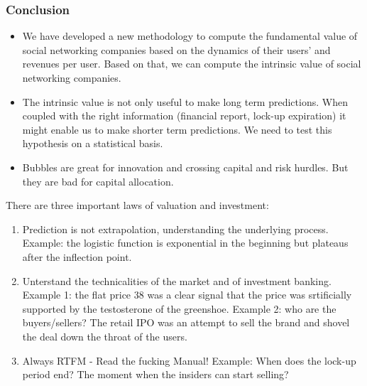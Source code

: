 \subsubsection{Conclusion}

\begin{itemize}
    \item We have developed a new methodology to compute the fundamental
        value of social networking companies based on the dynamics of their
        users' and revenues per user. Based on that, we can compute the
        intrinsic value of social networking companies.
    \item The intrinsic value is not only useful to make long term predictions.
        When coupled with the right information (financial report, lock-up
        expiration) it might enable us to make shorter term predictions. We
        need to test this hypothesis on a statistical basis.
    \item Bubbles are great for innovation and crossing capital and risk
        hurdles. But they are bad for capital allocation.
\end{itemize}

There are three important laws of valuation and investment:
\begin{enumerate}
    \item Prediction is not extrapolation, understanding the underlying
        process. Example: the logistic function is exponential in the
        beginning but plateaus after the inflection point.
    \item Unterstand the technicalities of the market and of investment
        banking. Example 1: the flat price 38 was a clear signal that the
        price was srtificially supported by the testosterone of the
        greenshoe. Example 2: who are the buyers/sellers? The retail IPO
        was an attempt to sell the brand and shovel the deal down the
        throat of the users.
    \item Always RTFM - Read the fucking Manual! Example: When does the
        lock-up period end? The moment when the insiders can start selling?
\end{enumerate}

